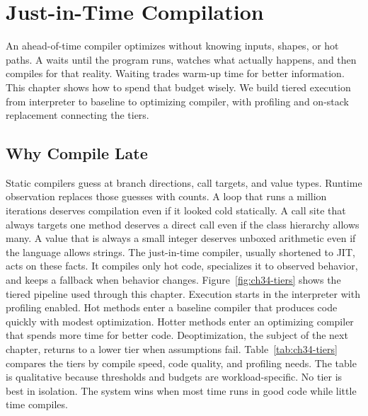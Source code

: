 \chapter{Just-in-Time Compilation}\label{ch:just-in-time-compilation}

An ahead-of-time compiler optimizes without knowing inputs, shapes, or hot paths.
A  waits until the program runs, watches what actually happens, and then compiles for that reality.
Waiting trades warm-up time for better information.
This chapter shows how to spend that budget wisely.
We build tiered execution from interpreter to baseline to optimizing compiler, with profiling and on-stack replacement connecting the tiers.

\section{Why Compile Late}\label{sec:ch34-why-late}

Static compilers guess at branch directions, call targets, and value types.
Runtime observation replaces those guesses with counts.
A loop that runs a million iterations deserves compilation even if it looked cold statically.
A call site that always targets one method deserves a direct call even if the class hierarchy allows many.
A value that is always a small integer deserves unboxed arithmetic even if the language allows strings.
The just-in-time compiler, usually shortened to JIT, acts on these facts.
It compiles only hot code, specializes it to observed behavior, and keeps a fallback when behavior changes.
Figure~\ref{fig:ch34-tiers} shows the tiered pipeline used through this chapter.
Execution starts in the interpreter with profiling enabled.
Hot methods enter a baseline compiler that produces code quickly with modest optimization.
Hotter methods enter an optimizing compiler that spends more time for better code.
Deoptimization, the subject of the next chapter, returns to a lower tier when assumptions fail.
Table~\ref{tab:ch34-tiers} compares the tiers by compile speed, code quality, and profiling needs.
The table is qualitative because thresholds and budgets are workload-specific.
No tier is best in isolation.
The system wins when most time runs in good code while little time compiles.

